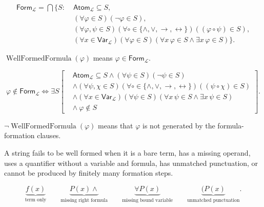 \begin{remark*}
\[
\begin{aligned}
\mathsf{Form}_{\mathcal L}
=
\bigcap\{S:\;&
\mathsf{Atom}_{\mathcal L}\subseteq S,\\
&(\forall\varphi\in S)(\neg\varphi\in S),\\
&(\forall\varphi,\psi\in S)
(\forall\circ\in\{\land,\lor,\to,\leftrightarrow\})
((\varphi\circ\psi)\in S),\\
&(\forall x\in\mathsf{Var}_{\mathcal L})(\forall\varphi\in S)
(\forall x\,\varphi\in S\land \exists x\,\varphi\in S)\}.
\end{aligned}
\]
\end{remark*}

\begin{remark*}
\(\operatorname{WellFormedFormula}(\varphi)\) means
\(\varphi\in\mathsf{Form}_{\mathcal L}\).
\end{remark*}

\begin{remark*}
\[
\varphi\notin\mathsf{Form}_{\mathcal L}
\Longleftrightarrow
\exists S\left[
\begin{aligned}
&\mathsf{Atom}_{\mathcal L}\subseteq S
\land
(\forall\psi\in S)(\neg\psi\in S)\\
&\land
(\forall\psi,\chi\in S)
(\forall\circ\in\{\land,\lor,\to,\leftrightarrow\})
((\psi\circ\chi)\in S)\\
&\land
(\forall x\in\mathsf{Var}_{\mathcal L})(\forall\psi\in S)
(\forall x\,\psi\in S\land \exists x\,\psi\in S)\\
&\land\ \varphi\notin S
\end{aligned}
\right].
\]
\end{remark*}

\begin{remark*}
\(\neg\operatorname{WellFormedFormula}(\varphi)\) means that \(\varphi\) is not
generated by the formula-formation clauses.
\end{remark*}

\begin{remark*}
A string fails to be well formed when it is a bare term, has a missing operand,
uses a quantifier without a variable and formula, has unmatched punctuation, or
cannot be produced by finitely many formation steps.
\end{remark*}

\begin{remark*}
\[
\underbrace{f(x)}_{\text{term only}}
\qquad
\underbrace{P(x)\land}_{\text{missing right formula}}
\qquad
\underbrace{\forall P(x)}_{\text{missing bound variable}}
\qquad
\underbrace{(P(x)}_{\text{unmatched punctuation}}.
\]
\end{remark*}

